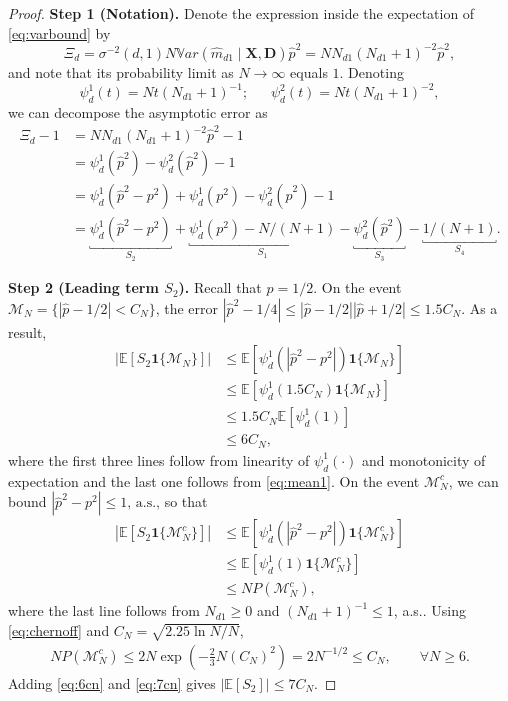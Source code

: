 \documentclass[12pt]{article}
\numberwithin{equation}{section}
\theoremstyle{plain}                         %
\theoremstyle{definition}                  %
\theoremstyle{remark}                      %
\newcommand{\E}{\mathbb{E}}
\newcommand{\Var}{\mathbb{V}ar}
\begin{document}
\begin{proof}

\textbf{Step 1 (Notation).} Denote the expression inside the expectation of \eqref{eq:varbound} by
$$
\Xi_d = \sigma^{-2}(d,1)  N \Var ( \widehat m_{d1} \mid \mathbf{X}, \mathbf{D})   \widehat{p}^2 = N N_{d1}(N_{d1}  + 1)^{-2} \widehat{p}^2,
$$
and note that its probability limit  as $N \to \infty$ equals $1$. Denoting 
$$\psi^1_{d} (t)= N t  (N_{d1} + 1)^{-1}; \;\; \quad \psi^2_{d} (t)= N t  (N_{d1} + 1)^{-2},
$$ 
we can decompose the asymptotic error as 
\begin{align}
\label{eq:vardecomp}
\Xi_d -1 &= N N_{d1}(N_{d1}  + 1)^{-2} \widehat{p}^2-1\\[2mm]
&= \psi^1_{d} (\widehat{p}^2) - \psi^2_{d}(\widehat{p}^2) - 1 \nonumber \\[2mm]
&=  \psi^1_{d} (\widehat{p}^2 -p^2) + \psi^1_d (p^2) -  \psi^2_{d}(\widehat{p}^2) - 1 \nonumber \\[2mm]
&=\underbracket{\psi^1_{d} (\widehat{p}^2-p^2)}_{S_2}   + \underbracket{\psi^1_{d} (p^2) -  N/(N+1) }_{S_1} - \underbracket{\psi^2_{d}(\widehat{p}^2)}_{S_3}  -\underbracket{1/(N+1)}_{S_4}. \nonumber 
\end{align}

\noindent 
\textbf{Step 2 (Leading term $S_2$).}  Recall that $p = 1/2$. On the event $\mathcal{M}_N = \{ |\widehat p - 1/2| <  C_N \}$, the error $ |\widehat p^2 -1/4| \leq |\widehat{p} - 1/2||\widehat{p} + 1/2| \leq 1.5C_N$. As a result, 
\begin{align}
  |\E\left[S_2 \bm{1}\{ \mathcal{M}_N  \}\right] | &\leq  \E \left[ \psi^1_{d} (|\widehat p^2 - p^2|)  \bm{1}\{ \mathcal{M}_N  \}\right]  \nonumber \\[2mm]
   &\leq \E [ \psi^1_{d} (1.5C_N)   \bm{1}\{ \mathcal{M}_N  \}] \nonumber  \\[2mm]
   &\leq 1.5C_N \E [ \psi_{d}^1(1)] \nonumber \\[2mm]
   & \leq 6C_N, \label{eq:6cn}
\end{align}
 where the first three lines follow from linearity of $\psi^1_d(\cdot)$ and monotonicity of expectation and the last one follows from \eqref{eq:mean1}.  On the  event $\mathcal{M}_N^c$, we can bound $ |\widehat p^2 -p^2| \leq 1 \text{, a.s.,}$ so that
\begin{align*}
    |\E [S_2 \bm{1}\{ \mathcal{M}^c_N  \}] | &\leq \E [ \psi^1_{d} (|\widehat p^2 - p^2|)  \bm{1}\{ \mathcal{M}^c_N  \}]  \\[2mm]
   & \leq \E [ \psi^1_{d} (1)  \bm{1}\{ \mathcal{M}^c_N  \}] \\[2mm]
   & \leq N  P (\mathcal{M}_N^c), 
   \end{align*}   
   where the last line follows from $N_{d1}\geq 0$ and $(N_{d1} +1)^{-1} \leq 1$, a.s.. Using \eqref{eq:chernoff} and $C_N = \sqrt{ 2.25 \ln N/N}$,
\begin{align}
 \textstyle N P (\mathcal{M}^c_N)  \leq 2 N \exp(-\frac{2}{3}N (C_N)^2 ) = 2 N^{-1/2} \leq C_N, \qquad \forall N \geq 6. \label{eq:7cn}
\end{align}
Adding \eqref{eq:6cn} and \eqref{eq:7cn} gives
$ |\E[S_2]|  \leq 7 C_N. $ 


\end{proof}
\end{document}
